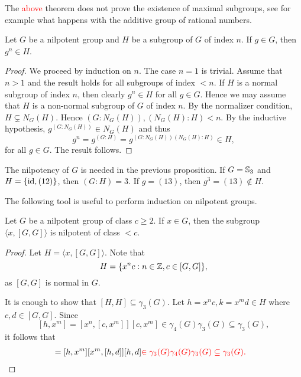 The \textcolor{red}{above} theorem does not prove the existence of maximal subgroups, see for example what happens with
the additive group of rational numbers. 

\begin{proposition}
	\label{pro:g^n}
	Let $G$ be a nilpotent group and $H$ be a subgroup of $G$ of index $n$. If 
	$g\in G$, then $g^n\in H$.
\end{proposition}

\begin{proof}
	We proceed by induction on $n$. The case $n=1$ is trivial. Assume  that $n>1$ and the result holds 
	for all subgroups of index $<n$. If $H$ is  a normal subgroup of index $n$, then clearly $g^n\in H$ for all $g\in G$. 
	Hence we may assume that $H$ is a non-normal subgroup of $G$ of index $n$. By the normalizer condition, $H\subsetneq N_G(H)$. Hence
	$(G:N_G(H)),(N_G(H):H)<n$. By the inductive hypothesis, $g^{(G:N_G(H))}\in N_G(H)$ and thus 
	\[
		g^n=g^{(G:H)}=g^{(G:N_G(H))(N_G(H):H)}\in H, 
	\]
	for all $g\in G$. The result follows.%
\end{proof}

\begin{example}
The nilpotency of $G$ is needed in the previous proposition. 
If $G=\mathbb{S}_3$ and $H=\{\operatorname{id},(12)\}$, then $(G:H)=3$. If 
$g=(13)$, then $g^{3}=(13)\not\in H$. 	
\end{example}

The following tool is useful to perform induction 
on nilpotent groups.  

\begin{lemma}
	\label{lem:a[GG]}
	Let $G$ be a nilpotent group of class $c\geq2$. If $x\in G$, then the subgroup 
	$\langle x,[G,G]\rangle$ is nilpotent of class $<c$.
\end{lemma}

\begin{proof}
	Let $H=\langle x,[G,G]\rangle$.   Note that  
	\[
		H=\{x^nc:n\in\mathbb{Z},c\in [G,G]\},
	\]
	as $[G,G]$ is normal in $G$. 
	
	It is enough to show that   
	$[H,H]\subseteq\gamma_3(G)$. Let $h=x^nc,k=x^md\in H$
	where $c,d\in [G,G]$. 
	Since 
	\[
	[h,x^m]=[x^n,[c,x^m]][c,x^m]\in\gamma_4(G)\gamma_3(G)\subseteq\gamma_3(G),
	\]
	it follows that  
	\begin{align*}
		[h,k]&=[h,x^m][x^m,[h,d]][h,d]\textcolor{red}{\in\gamma_3(G)\gamma_4(G)\gamma_3(G)\subseteq \gamma_3(G).}\qedhere
	\end{align*}
\end{proof}

